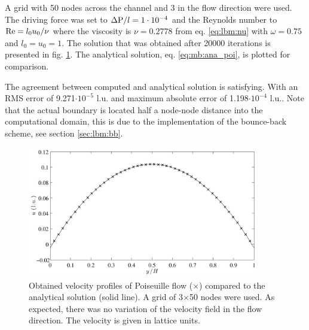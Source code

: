 A grid with 50 nodes across the channel and 3 in the flow direction
were used. The driving force was set to $\Delta \mathrm{P} / l = 1\cdot 10^{-4}$ and
the Reynolds number to $\mathrm{Re} = l_0 u_0/\nu$ where the viscosity
is $\nu = 0.2778$ from eq. \eqref{eq:lbm:nu} with $\omega = 0.75$ and
$l_0 = u_0 = 1$. The solution that was obtained after 20000
iterations is presented in fig. \ref{fig:mb:poi}. The analytical
solution, eq. \eqref{eq:mb:ana_poi}, is plotted for comparison.

The agreement between computed and analytical solution is
satisfying. With an RMS error of 9.271$\cdot 10^{-5}$ l.u. and maximum
absolute error of 1.198$\cdot10^{-4}$ l.u.. Note that the actual boundary
is located half a node-node distance into the computational domain,
this is due to the implementation of the bounce-back scheme, see
section \ref{sec:lbm:bb}.  

\begin{figure}
\begin{center}
\includegraphics[width=0.9\textwidth]{fig/poiseuille.pdf}
\end{center}
\caption{Obtained velocity profiles of Poiseuille flow ($\times$)
  compared to the analytical solution (solid line). A grid of
  3$\times$50 nodes were used. As expected, there was no variation of
  the velocity field in the flow direction. The velocity is given in
  lattice units.}
\label{fig:mb:poi}
\end{figure}

